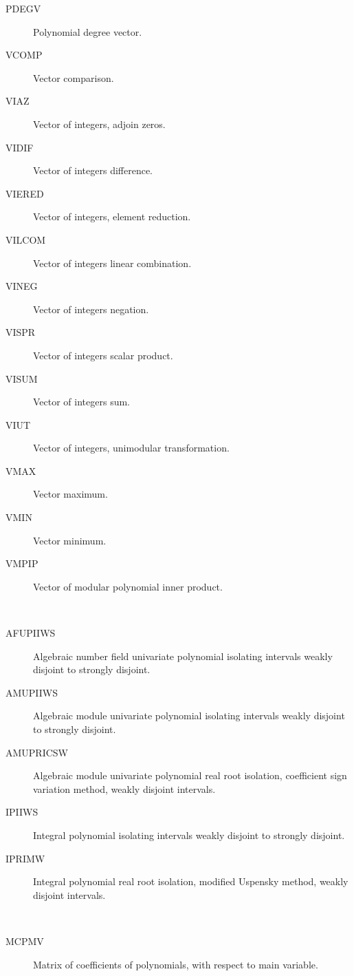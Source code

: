 \begin{description}
\begin{description}
  \item[PDEGV]  Polynomial degree vector.
  \item[VCOMP]  Vector comparison.
  \item[VIAZ]  Vector of integers, adjoin zeros.
  \item[VIDIF]  Vector of integers difference.
  \item[VIERED]  Vector of integers, element reduction.
  \item[VILCOM]  Vector of integers linear combination.
  \item[VINEG]  Vector of integers negation.
  \item[VISPR]  Vector of integers scalar product.
  \item[VISUM]  Vector of integers sum.
  \item[VIUT]  Vector of integers, unimodular transformation.
  \item[VMAX]  Vector maximum.
  \item[VMIN]  Vector minimum.
  \item[VMPIP]  Vector of modular polynomial inner product.
  \end{description}
\item[weakly] \ \ 
  \begin{description}
  \item[AFUPIIWS]  Algebraic number field univariate polynomial isolating
    intervals weakly disjoint to strongly disjoint.
  \item[AMUPIIWS]  Algebraic module univariate polynomial isolating intervals
    weakly disjoint to strongly disjoint.
  \item[AMUPRICSW]  Algebraic module univariate polynomial real root
    isolation, coefficient sign variation method, weakly disjoint intervals.
  \item[IPIIWS]  Integral polynomial isolating intervals weakly disjoint to
    strongly disjoint.
  \item[IPRIMW]  Integral polynomial real root isolation, modified Uspensky
    method, weakly disjoint intervals.
  \end{description}
\item[with] \ \ 
  \begin{description}
  \item[MCPMV]  Matrix of coefficients of polynomials, with respect to main
    variable.
  \end{description}
\item[write] \ \ 
  \begin{description}

\end{description}
\end{description}
